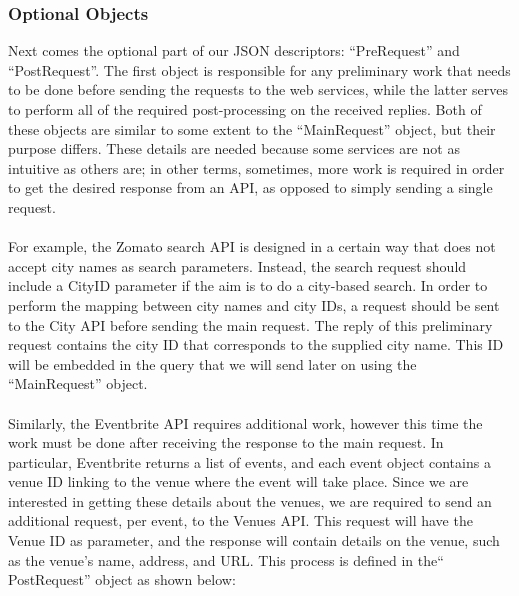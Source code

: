 \subsubsection{Optional Objects}
Next comes the optional part of our JSON descriptors: ``PreRequest'' and ``PostRequest''. The first object is responsible for any preliminary work that needs to be done before sending the requests to the web services, while the latter serves to perform all of the required post-processing on the received replies. Both of these objects are similar to some extent to the ``MainRequest'' object, but their purpose differs. These details are needed because some services are not as intuitive as others are; in other terms, sometimes, more work is required in order to get the desired response from an API, as opposed to simply sending a single request.\\\\
For example, the Zomato search API is designed in a certain way that does not accept city names as search parameters. Instead, the search request should include a CityID parameter if the aim is to do a city-based search. In order to perform the mapping between city names and city IDs, a request should be sent to the City API before sending the main request. The reply of this preliminary request contains the city ID that corresponds to the supplied city name. This ID will be embedded in the query that we will send later on using the ``MainRequest'' object.\\\\
Similarly, the Eventbrite API requires additional work, however this time the work must be done after receiving the response to the main request. In particular, Eventbrite returns a list of events, and each event object contains a venue ID linking to the venue where the event will take place. Since we are interested in getting these details about the venues, we are required to send an additional request, per event, to the Venues API. This request will have the Venue ID as parameter, and the response will contain details on the venue, such as the venue's name, address, and URL. This process is defined in the`` PostRequest'' object as shown below:
